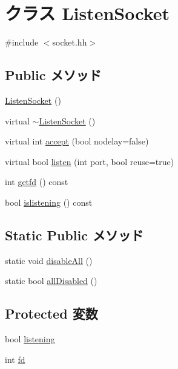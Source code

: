 \hypertarget{classListenSocket}{
\section{クラス ListenSocket}
\label{classListenSocket}
}


{\ttfamily \#include $<$socket.hh$>$}\subsection*{Public メソッド}
\begin{DoxyCompactItemize}
\item 
\hyperlink{classListenSocket_a34502b1f4b90c3f0fcd713cccebbd5fa}{ListenSocket} ()
\item 
virtual \hyperlink{classListenSocket_ad0bf1771782f4882ca89a9c9d3e5f8c6}{$\sim$ListenSocket} ()
\item 
virtual int \hyperlink{classListenSocket_a456b2a8397007045eca1f89d086b5778}{accept} (bool nodelay=false)
\item 
virtual bool \hyperlink{classListenSocket_adc0204f049c93d5c4ed27c604d1127a4}{listen} (int port, bool reuse=true)
\item 
int \hyperlink{classListenSocket_a6246250322a585921fc1e9d27b0d7b80}{getfd} () const 
\item 
bool \hyperlink{classListenSocket_a2848e5513ce657609b8210b7d23e4f6b}{islistening} () const 
\end{DoxyCompactItemize}
\subsection*{Static Public メソッド}
\begin{DoxyCompactItemize}
\item 
static void \hyperlink{classListenSocket_a238885c747f586049b766fa4fcd5ec12}{disableAll} ()
\item 
static bool \hyperlink{classListenSocket_a70ba2cf446c7e6363080efd46cd330c5}{allDisabled} ()
\end{DoxyCompactItemize}
\subsection*{Protected 変数}
\begin{DoxyCompactItemize}
\item 
bool \hyperlink{classListenSocket_a3e57a9a7cb30c699695affc832678a57}{listening}
\item 
int \hyperlink{classListenSocket_a6f8059414f0228f0256115e024eeed4b}{fd}
\end{DoxyCompactItemize}
